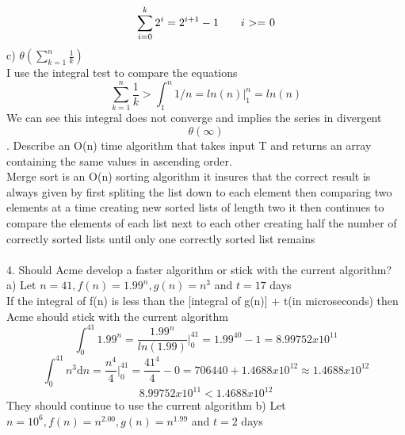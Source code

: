 \documentclass[12pt]{article}
\newcommand{\tab}{\hspace*{2em}}
\begin{document}
\begin{dmath} \sum_{i=0}^k 2^i=2^{i+1}-1 \tab \text{$i$ $>=$ 0}\end{dmath}
\tab c)		\begin{math}\theta(\sum_{k=1}^n \frac{1}{k}) \end{math}\\
\tab\tab I use the integral test to compare the equations
\begin{dmath*}\sum_{k=1}^n \frac{1}{k} > \int_{1}^n 1/n = ln(n) \Big|_1^n = ln(n) \end{dmath*}
We can see this integral does not converge and implies the series in divergent
\begin{dmath}\theta(\infty)\end{dmath}
. Describe an O(n) time algorithm that takes input T and returns an array containing the same values in ascending order.\\
	\tab Merge sort is an O(n) sorting algorithm it insures that the correct result is always \tab given by first spliting the list down to each element then comparing two elements at a \tab time creating  new sorted lists of length two it then continues to compare the elements \tab  of each list next to each other creating half the number of correctly sorted lists until \tab only one correctly sorted list remains\\\\
4. Should Acme develop a faster algorithm or stick with the current algorithm?\\
\tab a) Let \begin{math}n=41, f(n)=1.99^n, g(n)=n^3\end{math} and $t=17$ days\\
\tab\tab If the integral of f(n) is less than the [integral of g(n)] + t(in microseconds) then \tab\tab Acme should stick with the current algorithm
\begin{dmath*}\int_{0}^{41} 1.99^n=\frac{1.99^n}{ln(1.99)} \big|_0^{41}=1.99^{40}-1=8.99752x10^{11}\end{dmath*}
\begin{dmath*}
\int_0^{41} n^3\mathrm{d}n					
	= \frac{n^4}{4} \Big|_0^{41}
	=	\frac{41^4}{4}-0
	=	706440 + 1.4688x10^{12} \approx 1.4688x10^{12}
\end{dmath*}
\begin{dmath}8.99752x10^{11} < 1.4688x10^{12} \end{dmath}
\tab\tab They should continue to use the current algorithm\newpage
\tab b) Let \begin{math}n=10^6, f(n)=n^{2.00}, g(n)=n^{1.99}\end{math} and $t=2$ days\\
\end{document}
